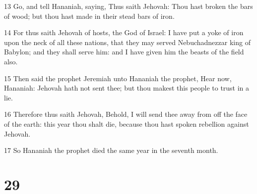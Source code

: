 \par 13 Go, and tell Hananiah, saying, Thus saith Jehovah: Thou hast broken the bars of wood; but thou hast made in their stead bars of iron.
\par 14 For thus saith Jehovah of hosts, the God of Israel: I have put a yoke of iron upon the neck of all these nations, that they may served Nebuchadnezzar king of Babylon; and they shall serve him: and I have given him the beasts of the field also.
\par 15 Then said the prophet Jeremiah unto Hananiah the prophet, Hear now, Hananiah: Jehovah hath not sent thee; but thou makest this people to trust in a lie.
\par 16 Therefore thus saith Jehovah, Behold, I will send thee away from off the face of the earth: this year thou shalt die, because thou hast spoken rebellion against Jehovah.
\par 17 So Hananiah the prophet died the same year in the seventh month.

\chapter{29}

